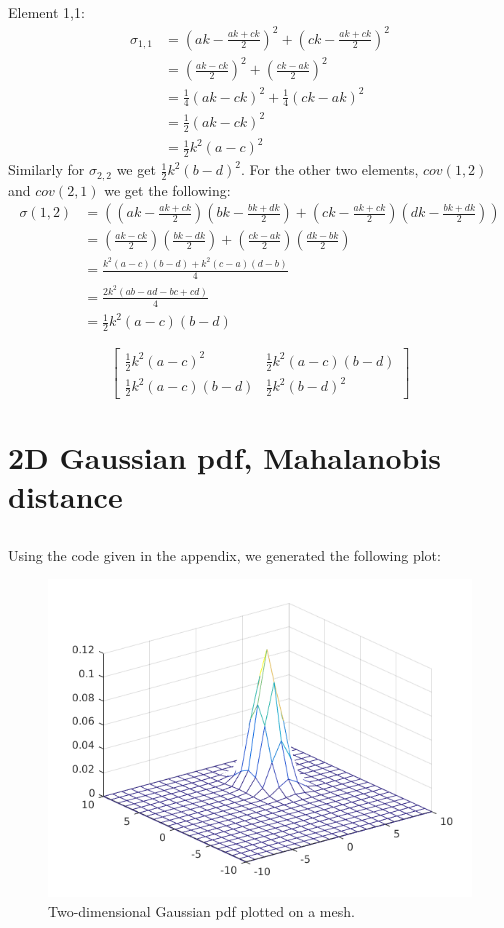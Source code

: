 \documentclass[10pt]{article}
\begin{document}
\subsection{}
Element 1,1:
\begin{align}
\sigma_{1,1} & = (ak-\frac{ak+ck}{2})^2+(ck-\frac{ak+ck}{2})^2 \\
& = (\frac{ak-ck}{2})^2 + (\frac{ck-ak}{2})^2 \\
& = \frac{1}{4}(ak-ck)^2 + \frac{1}{4}(ck-ak)^2 \\
& = \frac{1}{2}(ak-ck)^2 \\
& = \frac{1}{2}k^2(a-c)^2
\end{align}
Similarly for $\sigma_{2,2}$ we get $\frac{1}{2}k^2(b-d)^2$.
For the other two elements, $cov(1,2)$ and $cov(2,1)$ we get the following:
\begin{align}
\sigma(1,2) & = ((ak-\frac{ak+ck}{2})(bk-\frac{bk+dk}{2})+(ck-\frac{ak+ck}{2})(dk-\frac{bk+dk}{2})) \\
& = (\frac{ak-ck}{2}) (\frac{bk-dk}{2}) + (\frac{ck-ak}{2}) (\frac{dk-bk}{2}) \\
& = \frac{k^2(a-c)(b-d) + k^2(c-a)(d-b)}{4} \\
& = \frac{2k^2(ab - ad - bc + cd)}{4} \\
& = \frac{1}{2}k^2 (a-c)(b-d)
\end{align}

\begin{equation}
    \begin{bmatrix}
      \frac{1}{2}k^2(a-c)^2 & \frac{1}{2}k^2(a-c)(b-d)\\
      \frac{1}{2}k^2(a-c)(b-d) & \frac{1}{2}k^2(b-d)^2
    \end{bmatrix}
\end{equation}

\section{2D Gaussian pdf, Mahalanobis distance}
\subsection{}
Using the code given in the appendix, we generated the following plot:
\begin{figure}[H]
 \centering
 \includegraphics[width=.7\textwidth]{Ass31.png}
 \caption{Two-dimensional Gaussian pdf plotted on a mesh.}
 \label{31}
\end{figure}
\end{document}
